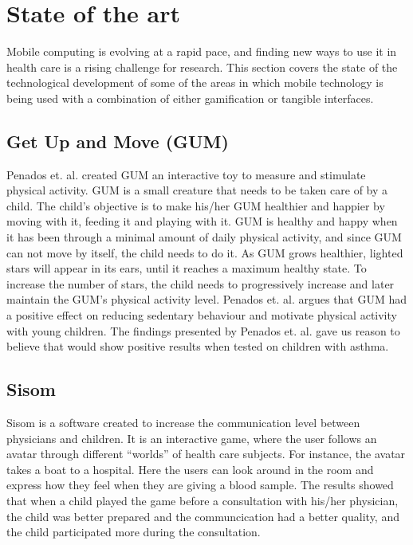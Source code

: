 \section{State of the art}
\label{sec:stateoftheart}
Mobile computing is evolving at a rapid pace, and finding new ways to use it in health care is a rising challenge for research. This section covers the state of the technological development of some of the areas in which mobile technology is being used with a combination of either gamification or tangible interfaces.   


\subsection{Get Up and Move (GUM)}
\label{sec:gum}
Penados et. al.\cite{penadosget} created GUM an interactive toy to measure and stimulate physical activity. GUM is a small creature that needs to be taken care of by a child. The child's objective is to make his/her GUM healthier and happier by moving with it, feeding it and playing with it. GUM is healthy and happy when it has been through a minimal amount of daily physical activity, and since GUM can not move by itself, the child needs to do it. As GUM grows healthier, lighted stars will appear in its ears, until it reaches a maximum healthy state. To increase the number of stars, the child needs to progressively increase and later maintain the GUM's physical activity level. Penados et. al. argues that GUM had a positive effect on reducing sedentary behaviour and motivate physical activity with young children. The findings presented by Penados et. al.\cite{penadosget} gave us reason to believe that \buddy{} would show positive results when tested on children with asthma. 


\subsection{Sisom}
Sisom is a software created to increase the communication level between physicians and children. It is an interactive game, where the user follows an avatar through different ``worlds'' of health care subjects. For instance, the avatar takes a boat to a hospital. Here the users can look around in the room and express how they feel when they are giving a blood sample. The results showed that when a child played the game before a consultation with his/her physician, the child was better prepared and the communcication had a better quality, and the child participated more during the consultation\cite{sisom-research}.


